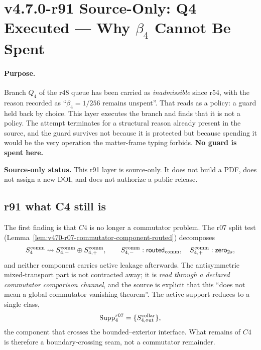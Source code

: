 \clearpage
\section*{v4.7.0-r91 Source-Only: Q4 Executed --- Why \texorpdfstring{\(\beta_4\)}{beta 4} Cannot Be Spent}
\label{sec:r91-q4-beta4-not-spendable}

\paragraph{Purpose.}
Branch \(Q_4\) of the r48 queue has been carried as \emph{inadmissible} since r54, with the
reason recorded as ``\(\beta_4=1/256\) remains unspent''.  That reads as a policy: a guard
held back by choice.  This layer executes the branch and finds that it is not a policy.  The
attempt terminates for a structural reason already present in the source, and the guard
survives not because it is protected but because spending it would be the very operation the
matter-frame typing forbids.  \textbf{No guard is spent here.}

\noindent\textbf{Source-only status.}
This r91 layer is source-only.  It does not build a PDF, does not assign a new DOI, and does
not authorize a public release.

\subsection*{r91 what C4 still is}
\label{subsec:r91-what-c4-is}

The first finding is that \(C4\) is no longer a commutator problem.  The r07 split test
(Lemma~\ref{lem:v470-r07-commutator-component-routed}) decomposes
\[
S_4^{\rm comm}\leadsto S_{4,-}^{\rm comm}\oplus S_{4,+}^{\rm comm},
\qquad
S_{4,-}^{\rm comm}:\mathsf{routed}_{\rm comm},
\quad
S_{4,+}^{\rm comm}:\mathsf{zero}_{2s},
\]
and neither component carries active leakage afterwards.  The antisymmetric mixed-transport
part is not contracted away; it is \emph{read through a declared commutator comparison
channel}, and the source is explicit that this ``does not mean a global commutator vanishing
theorem''.  The active support reduces to a single class,
\[
\operatorname{Supp}_4^{r07}=\{S_{4,\rm out}^{\rm collar}\},
\]
the component that crosses the bounded--exterior interface.  What remains of \(C4\) is
therefore a boundary-crossing seam, not a commutator remainder.

